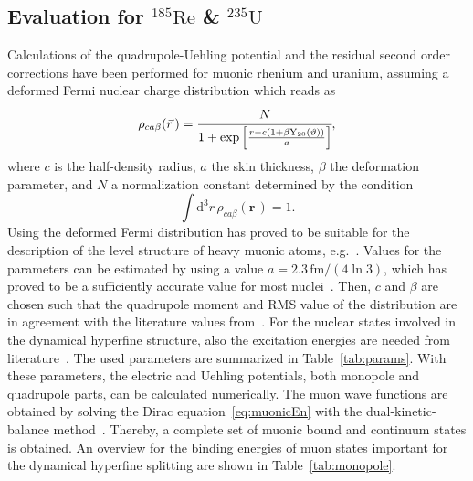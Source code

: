 \subsection{Evaluation for $^{185}\text{Re}$ \& $^{235}\text{U}$}
Calculations of the quadrupole-Uehling potential and the residual second order corrections have been performed for muonic rhenium and uranium, assuming a deformed Fermi nuclear charge distribution which reads as
\begin{equation}
\rho_{ca\beta}(\vec{r}\,)=\cfrac{N}{1+\exp \left[\frac{r-c(1+\beta \text{Y}_{20}(\vartheta))}{a}\right]},
\label{eq:deffermi_2}
\end{equation}
where $c$ is the half-density radius, $a$ the skin thickness, $\beta$ the deformation parameter, and $N$ a normalization constant determined by the condition
\begin{equation}
\int \text{d}^3r\, \rho_{ca\beta}(\mathbf{r}\,)=1.
\end{equation}
Using the deformed Fermi distribution has proved to be suitable for the description of the level structure of heavy muonic atoms, e.g.~\cite{hitlin1970,tanaka1984,tanaka1984_2}.
Values for the parameters can be estimated by using a value ${a}{=}{2.3\,\text{fm}/(4\ln 3)}$, which has proved to be a sufficiently accurate value for most nuclei~\cite{Beier2000}. Then, $c$ and $\beta$ are chosen such that the quadrupole moment and RMS value of the distribution are in agreement with the literature values from~\cite{Angeli2013,Stone2005}. For the nuclear states involved in the dynamical hyperfine structure, also the excitation energies are needed from literature~\cite{ENSDF}. The used parameters are summarized in Table~\ref{tab:params}.
With these parameters, the electric and Uehling potentials, both monopole and quadrupole parts, can be calculated numerically. The muon wave functions are obtained by solving the Dirac equation~\eqref{eq:muonicEn} with the dual-kinetic-balance method~\cite{Shabaev2004}. Thereby, a complete set of muonic bound and continuum states is obtained. An overview for the binding energies of muon states important for the dynamical hyperfine splitting are shown in Table~\ref{tab:monopole}.

